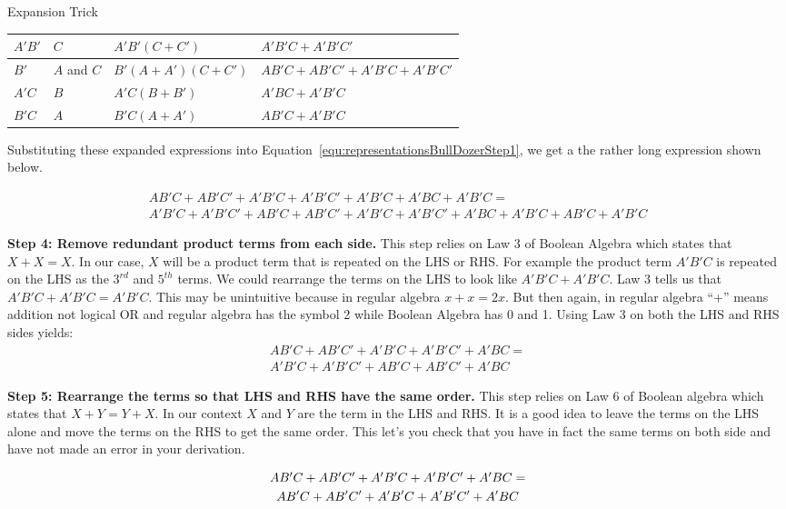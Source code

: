 \begin{process}{Expansion Trick}
\begin{tabular}[ht]{m{1cm}|m{2cm}|m{3cm}|m{3cm}}
$A'B'$	& $C$			&	$A'B'(C+C')$ 			&	$A'B'C+A'B'C'$				\\ \hline
$B'$		& $A$ and $C$		&	$B'(A + A')(C + C')$		&	$AB'C+AB'C' + A'B'C+A'B'C'$		\\ \hline
$A'C$		& $B$			&	$A'C(B+B')$				&	$A'BC+A'B'C$				\\ \hline
$B'C$		& $A$			&	$B'C(A+A')$				&	$AB'C+A'B'C$	\\ 
\end{tabular}

Substituting these expanded expressions into Equation~\ref{equ:representationsBullDozerStep1}, we get a
the rather long expression shown below.

\begin{multline}
\label{equ:representationsBullDozerStep3}
AB'C + AB'C' + A'B'C + A'B'C' + A'B'C + A'BC + A'B'C = \\
A'B'C + A'B'C' + AB'C + AB'C' + A'B'C + A'B'C' + A'BC + A'B'C + AB'C + A'B'C
\end{multline}

\textbf{Step 4: Remove redundant product terms from each side.}
This step relies on Law 3 of Boolean Algebra which states that $X+X = X$.  In our case, $X$ will be
a product term that is repeated on the LHS or RHS.  For example the product term $A'B'C$ is repeated on the 
LHS as the $3^{rd}$ and $5^{th}$ terms.  We could rearrange the terms on the LHS to look like 
$A'B'C + A'B'C$.  Law 3 tells us that $A'B'C + A'B'C = A'B'C$. This may be unintuitive because in
regular algebra $x+x = 2x$.  But then again, in regular algebra ``+'' means addition not logical OR
and regular algebra has the symbol 2 while Boolean Algebra has 0 and 1.  Using Law 3 on both the LHS and RHS sides
yields:
\begin{multline}
\label{equ:representationsBullDozerStep4}
AB'C + AB'C' + A'B'C + A'B'C' + A'BC = \\
A'B'C + A'B'C' + AB'C + AB'C' + A'BC
\end{multline}

\textbf{Step 5: Rearrange the terms so that LHS and RHS have the same order.}
This step relies on Law 6 of Boolean algebra which states that $X+Y = Y+X$.  In our 
context $X$ and $Y$ are the term in the LHS and RHS.  It is a good idea to leave the terms
on the LHS alone and move the terms on the RHS to get the same order.  This let's you check
that you have in fact the same terms on both side and have not made an error in your derivation.

\begin{multline}
\label{equ:representationsBullDozerStep5}
$$ AB'C + AB'C' + A'B'C + A'B'C' + A'BC =  \\
AB'C + AB'C' + A'B'C + A'B'C' + A'BC$$
\end{multline}


\end{process}
